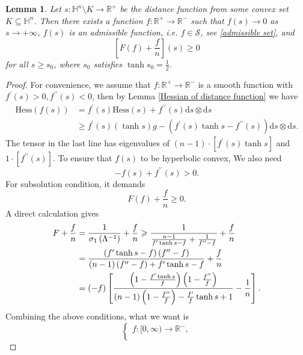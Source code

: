 \documentclass[reqno]{amsart}
\newtheorem{lemma}[theorem]{Lemma}
\theoremstyle{remark}
\theoremstyle{definition}
\numberwithin{equation}{section}
\begin{document}
\begin{lemma}\label{f(s)}
    Let $s : \mathbb{H}^n \setminus K \rightarrow \mathbb{R}^{+}$ be the distance function from some convex set $K \subseteq \mathbb{H}^n$. Then there exists a function $f: \mathbb{R}^{+} \to \mathbb{R}^{-}$ such that $f(s) \to 0$ as $s \to +\infty$, $f(s)$ is an admissible function, i.e. $f \in \mathcal{S}$, see \eqref{admissible set}, and 
    \[
    \left[ F(f) + \frac{f}{n} \right](s) \geqslant 0
    \]
    for all $s \geqslant s_0$, where $s_0$ satisfies $\tanh s_0 = \frac{1}{2}$.
\end{lemma}
\begin{proof}
For convenience, we assume that $f: \mathbb{R}^{+} \to \mathbb{R}^{-}$ is a smooth function with $f^{\prime}(s)>0, f^{\prime \prime}(s)<0$, then by Lemma \ref{Hessian of distance function} we have
\begin{align*}
    \text{Hess}(f(s)) &= f^{\prime}(s) \text{Hess}(s) + f^{\prime \prime}(s) \mathrm{d}s \otimes \mathrm{d}s \\
    &\geqslant         
    f^{\prime}(s) (\tanh s) g - \left( f^{\prime}(s)\tanh s - f^{\prime \prime}(s) \right) \mathrm{d}s \otimes \mathrm{d}s. 
\end{align*}
The tensor in the last line has eigenvalues of $(n-1) \cdot \left[ f^{\prime}(s) \tanh s \right]$ and $1 \cdot \left[ f^{\prime \prime}(s) \right]$. To ensure that $f(s)$ to be hyperbolic convex, We also need
\[
-f(s) + f^{\prime \prime}(s) > 0.
\]
For subsolution condition, it demands
\[
F(f) + \frac{f}{n} \geqslant 0.
\]
A direct calculation gives
\begin{align}\label{subsolution condition}
    F + \frac{f}{n} &= \frac{1}{\sigma_{1}\left( \Lambda^{-1} \right)} + \frac{f}{n} 
    \geqslant \frac{1}{\frac{n-1}{f^{\prime} \tanh s-f} + \frac{1}{f^{\prime \prime}-f}} + \frac{f}{n} \notag \\
    &= \frac{\left( f^{\prime} \tanh s-f \right)\left( f^{\prime \prime}-f \right)}{\left( n-1 \right)\left( f^{\prime \prime}-f \right) + f^{\prime} \tanh s-f} + \frac{f}{n} \notag \\
    &= (-f) \left[ \frac{\left( 1-\frac{f^{\prime} \tanh s}{f} \right) \left( 1-\frac{f^{\prime \prime}}{f} \right)}{\left( n-1 \right)\left( 1-\frac{f^{\prime \prime}}{f} \right) -\frac{f^{\prime}}{f} \tanh s +1} - \frac{1}{n} \right].
\end{align}
Combining the above conditions, what we want is 
\[
\begin{cases}
    f: [0, \infty) \to \mathbb{R^{-}}, \\

\end{cases}\]
\end{proof}
\end{document}

